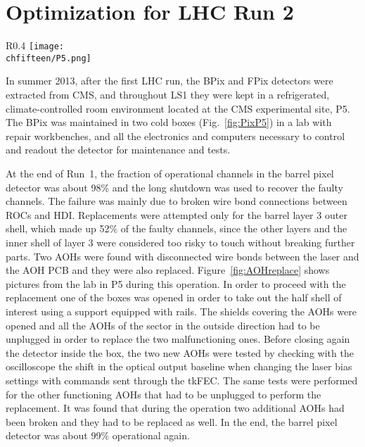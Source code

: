 \section{Optimization for LHC Run 2}

\begin{wrapfigure}{R}{0.4\textwidth}
 \centering
 \texttt{[image: \\chfifteen/P5.png]}
 \caption{Barrel pixel detector temporarily installed in P5.}
 \label{fig:PixP5}
\end{wrapfigure}

In summer 2013, after the first LHC run, the BPix and FPix detectors were extracted from CMS, and throughout LS1 they were kept in a refrigerated, climate-controlled room environment located at the CMS experimental site, P5.
The BPix was maintained in two cold boxes (Fig.~\ref{fig:PixP5}) in a lab with repair workbenches, and all the electronics and computers necessary to control and readout the detector for maintenance and tests.

At the end of Run~1, the fraction of operational channels in the barrel pixel detector was about 98\% and the long shutdown was used to recover the faulty channels.
The failure was mainly due to broken wire bond connections between ROCs and HDI. 
Replacements were attempted only for the barrel layer 3 outer shell, which made up 52\% of the faulty channels, since the other layers and the inner shell of layer 3 were considered too risky to touch without breaking further parts.
Two AOHs were found with disconnected wire bonds between the laser and the AOH PCB and they were also replaced. Figure~\ref{fig:AOHreplace} shows pictures from the lab in P5 during this operation. In order to proceed with the replacement one of the boxes was opened in order to take out the half shell of interest using a support equipped with rails. The shields covering the AOHs were opened and all the AOHs of the sector in the outside direction had to be unplugged in order to replace the two malfunctioning ones. Before closing again the detector inside the box, the two new AOHs were tested by checking with the oscilloscope the shift in the optical output baseline when changing the laser bias settings with commands sent through the tkFEC. The same tests were performed for the other functioning AOHs that had to be unplugged to perform the replacement. It was found that during the operation two additional AOHs had been broken and they had to be replaced as well.
In the end, the barrel pixel detector was about 99\% operational again.

